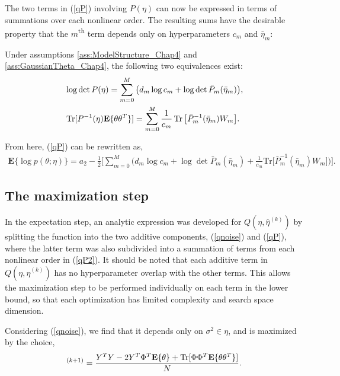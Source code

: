 The two terms in (\ref{qP}) involving $P(\eta)$ can now be expressed in terms of summations over each nonlinear order. The resulting sums have the desirable property that the $m$\textsuperscript{th} term depends only on hyperparameters $c_m$ and $\bar{\eta}_m$:
\begin{proposition}
Under assumptions \ref{ass:ModelStructure_Chap4} and \ref{ass:GaussianTheta_Chap4}, the following two equivalences exist:
\begin{align}
&\log \det P(\eta) = \sum_{m=0}^{M} \big( d_m \log c_m + \log \det \bar{P}_m(\bar{\eta}_m) \big), \label{qsum1}  \\
&\operatorname{Tr} [ P^{-1}(\eta) \textbf{E}\{ \theta  \theta^T \}] = \sum_{m=0}^{M} \frac{1}{c_m} \operatorname{Tr} \big[\bar{P}_m^{-1}(\bar{\eta}_m) W_{m} \big].
\label{qsum2}
\end{align}
\end{proposition}
From here, (\ref{qP}) can be rewritten as,
\begin{align}
\textbf{E}\{ \log p(\theta; \eta) \} = a_2 - \frac{1}{2} \Big[  \sum_{m=0}^{M} \bigg( d_m \log c_m + \log \det \bar{P}_m(\bar{\eta}_m) + \frac{1}{c_m} \text{Tr}\big[\bar{P}_m^{-1}(\bar{\eta}_m) W_{m} \big] \bigg) \Big]. 
\label{qP2}
\end{align}

\subsection{The maximization step}

In the expectation step, an analytic expression was developed for $Q(\eta,\hat{\eta}^{(k)})$ by splitting the function into the two additive components, (\ref{qnoise}) and (\ref{qP}), where the latter term was also subdivided into a summation of terms from each nonlinear order in (\ref{qP2}). It should be noted that each additive term in $Q(\eta,\hat{\eta}^{(k)})$ has no hyperparameter overlap with the other terms. This allows the maximization step to be performed individually on each term in the lower bound, so that each optimization has limited complexity and search space dimension.

Considering (\ref{qnoise}), we find that it depends only on $\sigma^2 \in \eta$, and is maximized by the choice,
\begin{equation}
[\sigma^2]^{(k+1)} = \frac{Y^T Y - 2 Y^T \Phi^T \textbf{E}\{\theta\} + \Tr [\Phi \Phi^T \textbf{E}\{ \theta \theta^T \}]}{N}.
\label{eq:noisevar_update}
\end{equation}

